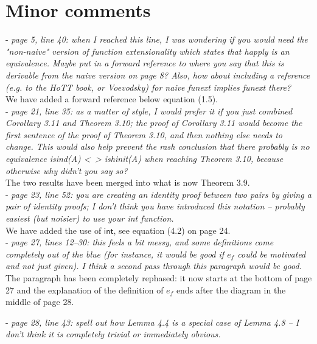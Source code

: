 \documentclass[11pt, oneside]{article}   	%
\begin{document}
\section{Minor comments}


- \emph{page 5, line 40: when I reached this line, I was wondering if you would need the "non-naive" version of function extensionality which states that happly is an equivalence. Maybe put in a forward reference to where you say that this is derivable from the naive version on page 8? Also, how about including a reference (e.g. to
 the HoTT book, or Voevodsky) for naive funext implies funext there?} \\

We have added a forward reference below equation (1.5).  \\

- \emph{page 21, line 35: as a matter of style, I would prefer it if you just combined Corollary 3.11 and Theorem 3.10; the proof of Corollary 3.11 would become the first sentence of the proof of Theorem 3.10, and then nothing else needs to change. This would also help prevent the rash conclusion that there probably is no
 equivalence isind(A) <~> ishinit(A) when reaching Theorem 3.10, because otherwise why didn't you say so?} \\ 

The two results have been merged into what is now Theorem 3.9. \\

- \emph{page 23, line 52: you are creating an identity proof between two pairs by giving a pair of identity proofs; I don't think you have introduced this notation -- probably easiest (but noisier) to use your int function.} \\

We have added the use of $\mathsf{int}$, see equation (4.2) on page 24. \\

- \emph{page 27, lines 12--30: this feels a bit messy, and some definitions come completely out of the blue (for instance, it would be good if $e_f$ could be motivated and not just given). I think a second pass through this paragraph would be good.} \\

The paragraph has been completely rephased: it now starts at the bottom of page 27 and the explanation of the definition of $e_f$ ends after the diagram in the middle of page 28.

- \emph{page 28, line 43: spell out how Lemma 4.4 is a special case of Lemma 4.8 -- I don't think it is completely trivial or immediately obvious.} \\
\end{document}
